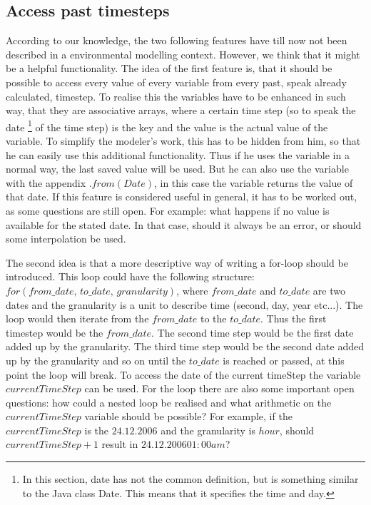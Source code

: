 \subsection{Access past timesteps}
\par
According to our knowledge, the two following features have till now not been described in a environmental modelling context. However, we think that it might be a helpful functionality.
The idea of the first feature is, that it should be possible to access every value of every variable from every past, speak already calculated, timestep. To realise this the variables have to be enhanced in such way, that they are associative arrays, where a certain time step (so to speak the date \footnote{In this section, date has not the common definition, but is something similar to the Java class Date. This means that it specifies the time and day.} of the time step) is the key and the value is the actual value of the variable. To simplify the modeler’s work, this has to be hidden from him, so that he can easily use this additional functionality. Thus if he uses the variable in a normal way, the last saved value will be used. But he can also use the variable with the appendix $.from(Date)$, in this case the variable returns the value of that date. If this feature is considered useful in general, it has to be worked out, as some questions are still open. For example: what happens if no value is available for the stated date. In that case, should it always be an error, or should some interpolation be used.
\par
The second idea is that a more descriptive way of writing a for-loop should be introduced. This loop could have the following structure:\\
$for(from\_date,\, to\_date,\, granularity)$, where $from\_date$ and $to\_date$ are two dates and the granularity is a unit to describe time (second, day, year etc...). The loop would then iterate from the $from\_date$ to the $to\_date$. Thus the first timestep would be the $from\_date$. The second time step would be the first date added up by the granularity. The third time step would be the second date added up by the granularity and so on until the $to\_date$ is reached or passed, at this point the loop will break. To access the date of the current timeStep the variable $currentTimeStep$ can be used. For the loop there are also some important  open questions: how could a nested loop be realised and what arithmetic on the $currentTimeStep$ variable should be possible? For example, if the $currentTimeStep$ is the $24.12.2006$ and the granularity is $hour$, should $currentTimeStep+1$ result in $24.12.2006 01:00 am$?
